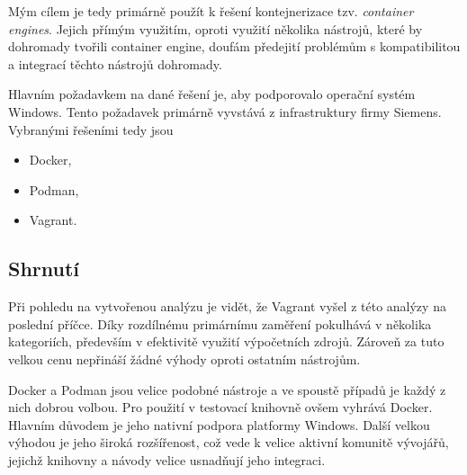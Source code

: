 Mým cílem je tedy primárně použít k řešení kontejnerizace tzv. \textit{container engines}. Jejich přímým využitím, oproti využití několika nástrojů, které by dohromady tvořili container engine, doufám předejití problémům s kompatibilitou a integrací těchto nástrojů dohromady.

Hlavním požadavkem na dané řešení je, aby podporovalo operační systém Windows. Tento požadavek primárně vyvstává z infrastruktury firmy Siemens. Vybranými řešeními tedy jsou

\begin{itemize}
    \item Docker,
    \item Podman,
    \item Vagrant. 
\end{itemize}


\subsection{Shrnutí}

Při pohledu na vytvořenou analýzu je vidět, že Vagrant vyšel z této analýzy na poslední příčce. Díky rozdílnému primárnímu zaměření pokulhává v několika kategoriích, především v efektivitě využití výpočetních zdrojů. Zároveň za tuto velkou cenu nepřináší žádné výhody oproti ostatním nástrojům.

Docker a Podman jsou velice podobné nástroje a ve spoustě případů je každý z nich dobrou volbou. Pro použití v testovací knihovně ovšem vyhrává Docker. Hlavním důvodem je jeho nativní podpora platformy Windows. Další velkou výhodou je jeho široká rozšířenost, což vede k velice aktivní komunitě vývojářů, jejichž knihovny a návody velice usnadňují jeho integraci. 
